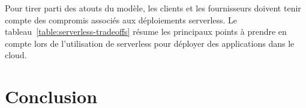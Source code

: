 Pour tirer parti des atouts du modèle, les clients et les fournisseurs doivent tenir compte des compromis associés aux déploiements serverless. Le tableau~\ref{table:serverless-tradeoffs} résume les principaux points à prendre en compte lors de l'utilisation de serverless pour déployer des applications dans le cloud.

\section{Conclusion}
